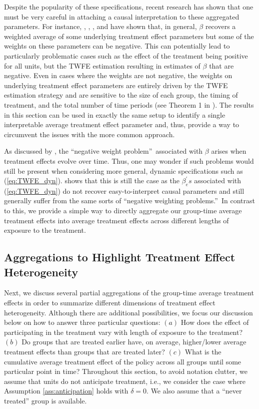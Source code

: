 \documentclass[11pt]{article}%
\theoremstyle{plain}
\numberwithin{sassumption}{section}
\numberwithin{equation}{section}
\begin{document}
Despite the popularity of these specifications, recent research has shown that
one must be very careful in attaching a causal interpretation to these
aggregated parameters. For instance, \cite{Borusyak2017},
\cite{Goodman-bacon2017}, \cite{DeChaisemartin2016}, and \cite{Athey2018} have
shown that, in general, $\beta$ recovers a weighted average of some underlying
treatment effect parameters but some of the weights on these parameters can be
negative. This can potentially lead to particularly problematic cases such as
the effect of the treatment being positive for all units, but the TWFE
estimation resulting in estimates of $\beta$ that are negative. Even in cases
where the weights are not negative, the weights on underlying treatment effect
parameters are entirely driven by the TWFE estimation strategy and are
sensitive to the size of each group, the timing of treatment, and the total
number of time periods (see Theorem 1 in \cite{Goodman-bacon2017}). The
results in this section can be used in exactly the same setup to identify a
single interpretable average treatment effect parameter and, thus, provide a
way to circumvent the issues with the more common approach.

As discussed by \cite{Goodman-bacon2017}, the \textquotedblleft negative
weight problem\textquotedblright\ associated with $\beta$ arises when
treatment effects evolve over time. Thus, one may wonder if such problems
would still be present when considering more general, dynamic specifications
such as (\ref{eq:TWFE_dyn}). \cite{Abraham2018} shows that this is still the
case as the $\beta_{e}^{\prime}s$ associated with (\ref{eq:TWFE_dyn}) do not
recover easy-to-interpret causal parameters and still generally suffer from
the same sorts of \textquotedblleft negative weighting
problems.\textquotedblright\ In contrast to this, we provide a simple way to
directly aggregate our group-time average treatment effects into average
treatment effects across different lengths of exposure to the treatment.

\subsection{Aggregations to Highlight Treatment Effect Heterogeneity}

Next, we discuss several partial aggregations of the group-time average
treatment effects in order to summarize different dimensions of treatment
effect heterogeneity. Although there are additional possibilities, we focus
our discussion below on how to answer three particular questions: $\left(
a\right)  $ How does the effect of participating in the treatment vary with
length of exposure to the treatment? $\left(  b\right)  $ Do groups that are
treated earlier have, on average, higher/lower average treatment effects than
groups that are treated later? $\left(  c\right)  $ What is the cumulative
average treatment effect of the policy across all groups until some particular
point in time? Throughout this section, to avoid notation clutter, we assume that units
do not anticipate treatment, i.e., we consider the case where Assumption
\ref{ass:anticipation} holds with $\delta=0$. We also assume that a ``never treated'' group is available.
\end{document}

